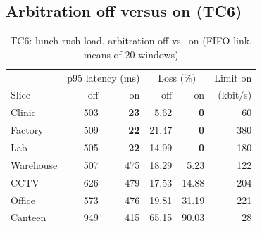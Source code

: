 \documentclass[conference]{IEEEtran}
\begin{document}
\subsection{Arbitration off versus on (TC6)}

\begin{table}[t]
\caption{TC6: lunch-rush load, arbitration off vs.\ on (FIFO link, means of 20 windows)}
\label{tab:tc6}
\centering
\footnotesize
\setlength{\tabcolsep}{3pt}
\begin{tabular}{@{}lrrrrr@{}}
\toprule
 & \multicolumn{2}{c}{p95 latency (ms)} & \multicolumn{2}{c}{Loss (\%)} & Limit on \\
Slice & off & on & off & on & (kbit/s) \\
\midrule
Clinic & 503 & \textbf{23} & 5.62 & \textbf{0} & 60 \\
Factory & 509 & \textbf{22} & 21.47 & \textbf{0} & 380 \\
Lab & 505 & \textbf{22} & 14.99 & \textbf{0} & 180 \\
Warehouse & 507 & 475 & 18.29 & 5.23 & 122 \\
CCTV & 626 & 479 & 17.53 & 14.88 & 204 \\
Office & 573 & 476 & 19.81 & 31.19 & 221 \\
Canteen & 949 & 415 & 65.15 & 90.03 & 28 \\
\bottomrule
\end{tabular}
\end{table}
\end{document}
